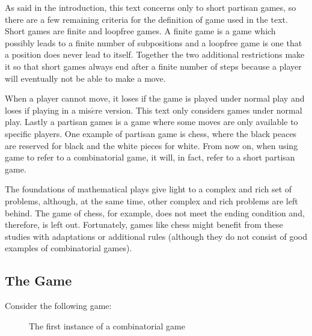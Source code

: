 As said in the introduction, this text concerns only to short partisan games, so there are a few remaining criteria for the definition of game used in the text. Short games are finite and loopfree games. A finite game is a game which possibly leads to a finite number of subpositions and a loopfree game is one that a position does never lead to itself. Together the two additional restrictions make it so that short games always end after a finite number of steps because a player will eventually not be able to make a move.

When a player cannot move, it loses if the game is played under normal play and loses if playing in a mis$\acute{e}$re version. This text only considers games under normal play. Lastly a partisan games is a game where some moves are only available to specific players. One example of partisan game is chess, where the black peaces are reserved for black and the white pieces for white. From now on, when using game to refer to a combinatorial game, it will, in fact, refer to a short partisan game.  

The foundations of mathematical plays give light to a complex and rich set of problems, although, at the same time, other complex and rich problems are left behind. The game of chess, for example, does not meet the ending condition and, therefore, is left out. Fortunately, games like chess might benefit from these studies with adaptations or additional rules (although they do not consist of good examples of combinatorial games).\\

\subsection*{The Game}

Consider the following game:\\

\begin{figure} [!ht]
\begin{center}
\end{center}
\caption{The first instance of a combinatorial game}
\end{figure}

